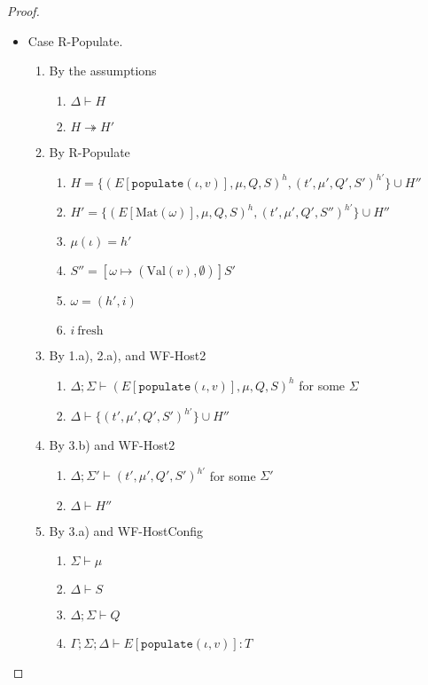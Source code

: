 \documentclass{article}
\theoremstyle{definition}
\newcommand{\Val}[1]{\text{Val}(#1)}
\begin{document}
\begin{proof}
\begin{itemize}
\item Case R-Populate.
\begin{enumerate}
\item By the assumptions
  \begin{enumerate}[label=(\alph*)]
  \item $\Delta \vdash H$
  \item $H \twoheadrightarrow H'$
  \end{enumerate}
\item By R-Populate
  \begin{enumerate}[label=(\alph*)]
  \item $H = \{ (E[\texttt{populate}(\iota, v)], \mu, Q, S)^h, (t', \mu', Q', S')^{h'} \} \cup H''$
  \item $H' = \{ (E[\text{Mat}(\omega)], \mu, Q, S)^h, (t', \mu', Q', S'')^{h'} \} \cup H''$
  \item $\mu(\iota) = h'$
  \item $S''        = [\omega \mapsto ({\Val v}, \emptyset)]S'$
  \item $\omega     = (h', i)$
  \item $i~\text{fresh}$
  \end{enumerate}
\item By 1.a), 2.a), and WF-Host2
  \begin{enumerate}[label=(\alph*)]
  \item $\Delta ; \Sigma \vdash (E[\texttt{populate}(\iota, v)], \mu, Q, S)^h$ for some $\Sigma$
  \item $\Delta \vdash \{ (t', \mu', Q', S')^{h'} \} \cup H''$
  \end{enumerate}
\item By 3.b) and WF-Host2
  \begin{enumerate}[label=(\alph*)]
  \item $\Delta ; \Sigma' \vdash (t', \mu', Q', S')^{h'}$ for some $\Sigma'$
  \item $\Delta \vdash H''$
  \end{enumerate}
\item By 3.a) and WF-HostConfig
  \begin{enumerate}[label=(\alph*)]
  \item $\Sigma \vdash \mu$
  \item $\Delta \vdash S$
  \item $\Delta ; \Sigma \vdash Q$
  \item $\Gamma ; \Sigma ; \Delta \vdash E[\texttt{populate}(\iota, v)] : T$

\end{enumerate}
\end{enumerate}
\end{itemize}
\end{proof}
\end{document}
